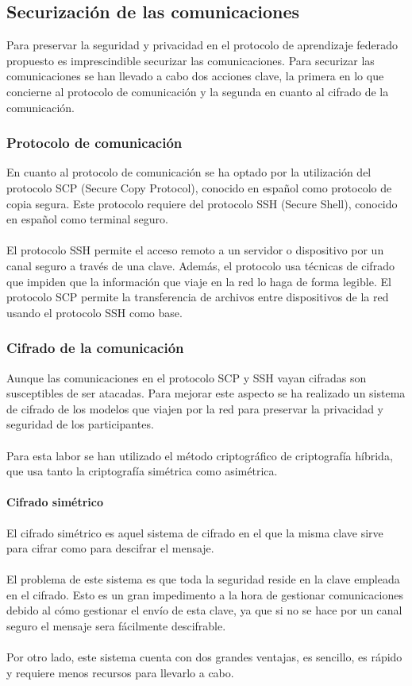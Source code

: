 \subsection{Securización de las comunicaciones} \label{SegCom}
Para preservar la seguridad y privacidad en el protocolo de aprendizaje federado propuesto es imprescindible securizar las comunicaciones. Para securizar las comunicaciones se han llevado a cabo dos acciones clave, la primera en lo que concierne al protocolo de comunicación y la segunda en cuanto al cifrado de la comunicación.

\subsubsection{Protocolo de comunicación}
En cuanto al protocolo de comunicación se ha optado por la utilización del protocolo SCP (Secure Copy Protocol), conocido en español como protocolo de copia segura. Este protocolo requiere del protocolo SSH (Secure Shell), conocido en español como terminal seguro.
\\ \\
El protocolo SSH permite el acceso remoto a un servidor o dispositivo por un canal seguro a través de una clave. Además, el protocolo usa técnicas de cifrado que impiden que la información que viaje en la red lo haga de forma legible. El protocolo SCP permite la transferencia de archivos entre dispositivos de la red usando el protocolo SSH como base.

\subsubsection{Cifrado de la comunicación}
Aunque las comunicaciones en el protocolo SCP y SSH vayan cifradas son susceptibles de ser atacadas. Para mejorar este aspecto se ha realizado un sistema de cifrado de los modelos que viajen por la red para preservar la privacidad y seguridad de los participantes.
\\ \\ 
Para esta labor se han utilizado el método criptográfico de criptografía híbrida, que usa tanto la criptografía simétrica como asimétrica.

\paragraph{Cifrado simétrico} 
El cifrado simétrico es aquel sistema de cifrado en el que la misma clave sirve para cifrar como para descifrar el mensaje. 
\\ \\
El problema de este sistema es que toda la seguridad reside en la clave empleada en el cifrado. Esto es un gran impedimento a la hora de gestionar comunicaciones debido al cómo gestionar el envío de esta clave, ya que si no se hace por un canal seguro el mensaje sera fácilmente descifrable.
\\ \\
Por otro lado, este sistema cuenta con dos grandes ventajas, es sencillo, es rápido y requiere menos recursos para llevarlo a cabo.

